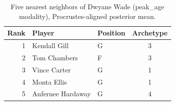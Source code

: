 \begin{table}[htbp]
  \centering\small
  \begin{tabular}{rllc}
    \toprule
    Rank & Player & Position & Archetype \\
    \midrule
    1 & Kendall Gill & G & 3 \\
    2 & Tom Chambers & F & 3 \\
    3 & Vince Carter & G & 1 \\
    4 & Monta Ellis & G & 1 \\
    5 & Anfernee Hardaway & G & 4 \\
    \bottomrule
  \end{tabular}
  \caption{Five nearest neighbors of Dwyane Wade (peak_age modality), Procrustes-aligned posterior mean.}
  \label{tab:Dwyane_Wade_neighbors_peak_age}
\end{table}

